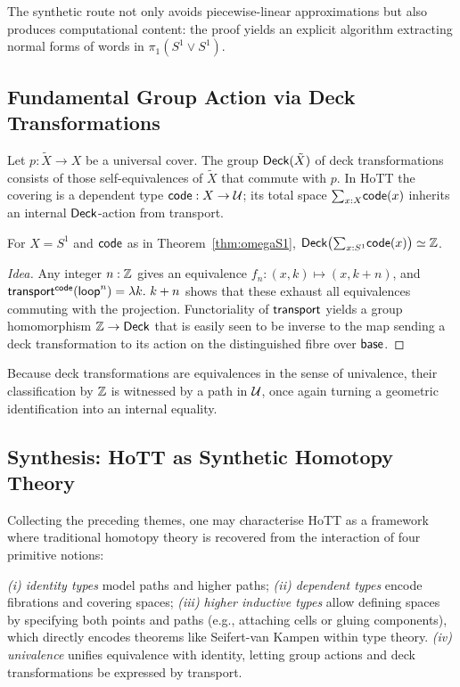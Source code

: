 The synthetic route not only avoids piecewise-linear approximations but
also produces computational content: the proof yields an explicit
algorithm extracting normal forms of words in \(\pi_1(S^1\vee S^1)\).

\subsection{Fundamental Group Action via Deck Transformations}\label{sec:deck}
Let \(p:\tilde X\to X\) be a universal cover.  The group
\(\textsf{Deck}(\tilde X)\) of deck transformations consists of those
self-equivalences of \(\tilde X\) that commute with \(p\).
In HoTT the covering is a dependent type
\(\textsf{code}:X\to\mathcal{U}\); its total space
\(\textstyle\mathbf{\sum}_{x:X}\textsf{code}(x)\) inherits an internal \(\textsf{Deck}\)-action from
transport.

\begin{theorem}
  For \(X=S^1\) and \(\textsf{code}\) as in Theorem~\ref{thm:omegaS1},
  \(\textsf{Deck}\bigl(\textstyle\mathbf{\sum}_{x:S^1}\textsf{code}(x)\bigr)\simeq\mathbb{Z}\).
\end{theorem}

\begin{proof}[Idea]
  Any integer \(n:\mathbb{Z}\) gives an equivalence
  \(f_n:(x,k)\mapsto(x,k+n)\), and
  \(\textsf{transport}^{\textsf{code}}(\textsf{loop}^{n})=\lambda k.~k+n\) shows that these
  exhaust all equivalences commuting with the projection.  Functoriality
  of \(\textsf{transport}\) yields a group homomorphism \(\mathbb{Z}\to\textsf{Deck}\) that is
  easily seen to be inverse to the map sending a deck transformation to
  its action on the distinguished fibre over \(\textsf{base}\).
\end{proof}

Because deck transformations are equivalences in the sense of
univalence, their classification by \(\mathbb{Z}\) is witnessed by a path in
\(\mathcal{U}\), once again turning a geometric identification into an internal
equality.

\subsection{Synthesis: HoTT as Synthetic Homotopy Theory}\label{sec:synthesis}
Collecting the preceding themes, one may characterise HoTT as a
framework where traditional homotopy theory is recovered from the
interaction of four primitive notions:

\medskip
\noindent
\emph{(i) identity types} model paths and higher paths;
\emph{(ii) dependent types} encode fibrations and covering spaces;
\emph{(iii) higher inductive types} allow defining spaces by specifying both points and paths (e.g., attaching cells or gluing components), which directly encodes theorems like Seifert-van Kampen within type theory.
\emph{(iv) univalence} unifies equivalence with identity, letting group
actions and deck transformations be expressed by transport.


